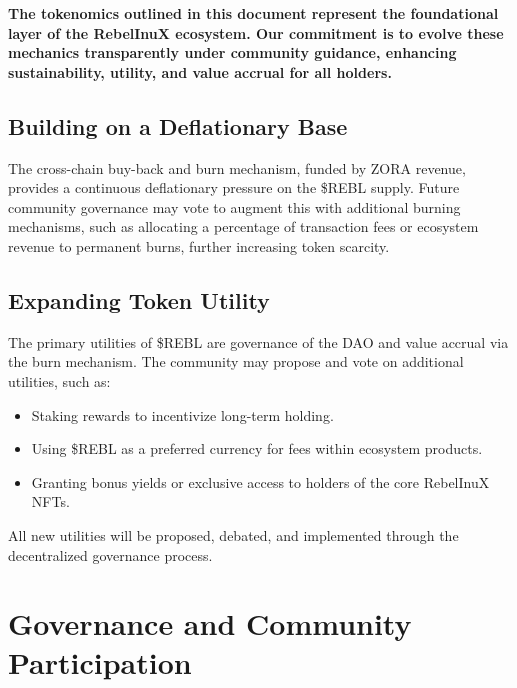 \documentclass{article}
\begin{document}
\begin{tcolorbox}[colback=headerColor!10!white, colframe=headerColor, boxrule=2pt, width=\textwidth, arc=6mm, left=8mm, right=8mm, top=6mm, bottom=6mm]
\textbf{The tokenomics outlined in this document represent the foundational layer of the RebelInuX ecosystem. Our commitment is to evolve these mechanics transparently under community guidance, enhancing sustainability, utility, and value accrual for all holders.}

\subsection[
  \texorpdfstring{\color{primaryColor}Building on a Deflationary Base}{Building on a Deflationary Base}
]{\color{primaryColor}Building on a Deflationary Base}
The cross-chain buy-back and burn mechanism, funded by ZORA revenue, provides a continuous deflationary pressure on the \$REBL supply. Future community governance may vote to augment this with additional burning mechanisms, such as allocating a percentage of transaction fees or ecosystem revenue to permanent burns, further increasing token scarcity.

\subsection[
  \texorpdfstring{\color{primaryColor}Expanding Token Utility}{Expanding Token Utility}
]{\color{primaryColor}Expanding Token Utility}
The primary utilities of \$REBL are governance of the DAO and value accrual via the burn mechanism. The community may propose and vote on additional utilities, such as:
\begin{itemize}
    \item Staking rewards to incentivize long-term holding.
    \item Using \$REBL as a preferred currency for fees within ecosystem products.
    \item Granting bonus yields or exclusive access to holders of the core RebelInuX NFTs.
\end{itemize}
All new utilities will be proposed, debated, and implemented through the decentralized governance process.
\end{tcolorbox}



\section[
  \texorpdfstring{\color{primaryColor}Governance and Community Participation}{Governance and Community Participation}
]{\color{primaryColor}\textbf{Governance and Community Participation}}
\end{document}
